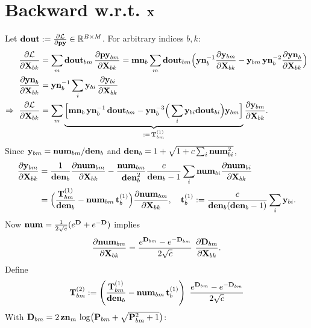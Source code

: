 \documentclass{article}
\begin{document}

\section{Backward w.r.t. $\v{X}$}

Let $\v{dout}:=\ddfrac{\mathcal{L}}{\v{py}}\in\mathbb{R}^{B\times M}$. For arbitrary indices $b,k$:
\begin{align}
\ddfrac{\mathcal{L}}{\v{X}{bk}}
&= \sum_m \v{dout}{bm}\,\ddfrac{\v{py}{bm}}{\v{X}{bk}}
= \v{mn}_b \sum_m \v{dout}{bm}\Big(\v{yn}_b^{-1}\ddfrac{\v{y}{bm}}{\v{X}{bk}} - \v{y}{bm}\,\v{yn}_b^{-2}\ddfrac{\v{yn}_b}{\v{X}{bk}}\Big) \\
\ddfrac{\v{yn}_b}{\v{X}{bk}} &= \v{yn}_b^{-1}\sum_i \v{y}{bi}\,\ddfrac{\v{y}{bi}}{\v{X}{bk}} \\
\Rightarrow\ \ddfrac{\mathcal{L}}{\v{X}{bk}}
&= \sum_m \underbrace{\Big[\v{mn}_b\,\v{yn}_b^{-1}\,\v{dout}{bm}
- \v{yn}_b^{-3}\Big(\sum_i \v{y}{bi}\v{dout}{bi}\Big)\v{y}{bm}\Big]}_{:=\,\T{1}{bm}}
\ddfrac{\v{y}{bm}}{\v{X}{bk}}.
\end{align}
Since $\v{y}{bm}=\v{num}{bm}/\v{den}{b}$ and $\v{den}{b} = 1+\sqrt{1+c\sum_i \v{num}{bi}^2}$,
\begin{align}
\ddfrac{\v{y}{bm}}{\v{X}{bk}}
&= \frac{1}{\v{den}{b}}\ddfrac{\v{num}{bm}}{\v{X}{bk}}
- \frac{\v{num}{bm}}{\v{den}{b}^2}\frac{c}{\v{den}{b}-1}\sum_i \v{num}{bi}\ddfrac{\v{num}{bi}}{\v{X}{bk}} \\
&= \Big(\frac{\T{1}{bm}}{\v{den}{b}} - \v{num}{bm}\,\t{1}{b}\Big)\ddfrac{\v{num}{bm}}{\v{X}{bk}},\quad
\t{1}{b}:=\frac{c}{\v{den}{b}(\v{den}{b}-1)}\sum_{i} \v{y}{bi}.
\end{align}
Now $\v{num}=\tfrac{1}{2\sqrt{c}}(\ev{D}+\ev{-D})$ implies
\begin{align}
\ddfrac{\v{num}{bm}}{\v{X}{bk}}
= \frac{\ev{D}{bm}-\ev{-D}{bm}}{2\sqrt{c}}\ \ddfrac{\v{D}{bm}}{\v{X}{bk}}.
\end{align}
Define 
\[
\T{2}{bm}:=\left(\frac{\T{1}{bm}}{\v{den}{b}} - \v{num}{bm}\,\t{1}{b}\right)\ \frac{\ev{D}{bm} - \ev{-D}{bm}}{2\sqrt{c}}
\]
With $\v{D}{bm}=2\,\v{zn}{m}\,\log\!\big(\v{P}{bm}+\sqrt{\v{P}{bm}^2+1}\big)$:
\end{document}
